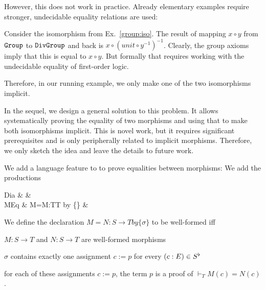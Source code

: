 However, this does not work in practice.
Already elementary examples require stronger, undecidable equality relations are used:

\begin{example}
Consider the isomorphism from Ex.~\ref{group:iso}.
The result of mapping $x\circ y$ from $\operatorname{\mathtt{Group}}$ to $\operatorname{\mathtt{DivGroup}}$ and back is $x\circ(unit\circ y^{-1})^{-1}$.
Clearly, the group axioms imply that this is equal to $x\circ y$.
But formally that requires working with the undecidable equality of first-order logic.
\end{example}

Therefore, in our running example, we only make one of the two isomorphisms implicit.

In the sequel, we design a general solution to this problem.
It allows systematically proving the equality of two morphisms and using that to make both isomorphisms implicit.
This is novel work, but it requires significant prerequisites and is only peripherally related to implicit morphisms.
Therefore, we only sketch the idea and leave the details to future work.

We add a language feature to \mmt to prove equalities between morphisms:
We add the productions
\begin{grammar}
Dia   &   &\\
MEq   &  M=M:T\to T by \{\} &\\
\end{grammar}


We define the declaration $M=N:S\to T by \{\sigma\}$ to be well-formed iff
\begin{compactitem} 
  \item $M:S\to T$ and $N:S\to T$ are well-formed morphisms
  \item $\sigma$ contains exactly one assignment $c:=p$ for every $(c:E)\in S^\flat$
  \item for each of these assignments $c:=p$, the term $p$ is a proof of $\vdash_T M(c)=N(c)$.
\end{compactitem}

